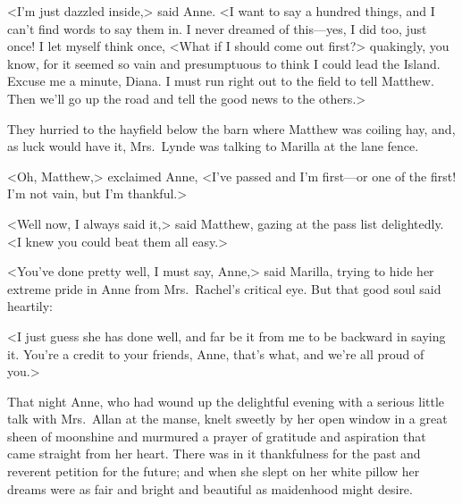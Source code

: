 <I'm just dazzled inside,> said Anne. <I want to say a hundred things, and I can't find words to say them in. I never dreamed of this—yes, I did too, just once! I let myself think once, <What if I should come out first?> quakingly, you know, for it seemed so vain and presumptuous to think I could lead the Island. Excuse me a minute, Diana. I must run right out to the field to tell Matthew. Then we'll go up the road and tell the good news to the others.>

They hurried to the hayfield below the barn where Matthew was coiling hay, and, as luck would have it, Mrs.~Lynde was talking to Marilla at the lane fence.

<Oh, Matthew,> exclaimed Anne, <I've passed and I'm first—or one of the first! I'm not vain, but I'm thankful.>

<Well now, I always said it,> said Matthew, gazing at the pass list delightedly. <I knew you could beat them all easy.>

<You've done pretty well, I must say, Anne,> said Marilla, trying to hide her extreme pride in Anne from Mrs.~Rachel's critical eye. But that good soul said heartily:

<I just guess she has done well, and far be it from me to be backward in saying it. You're a credit to your friends, Anne, that's what, and we're all proud of you.>

That night Anne, who had wound up the delightful evening with a serious little talk with Mrs.~Allan at the manse, knelt sweetly by her open window in a great sheen of moonshine and murmured a prayer of gratitude and aspiration that came straight from her heart. There was in it thankfulness for the past and reverent petition for the future; and when she slept on her white pillow her dreams were as fair and bright and beautiful as maidenhood might desire.